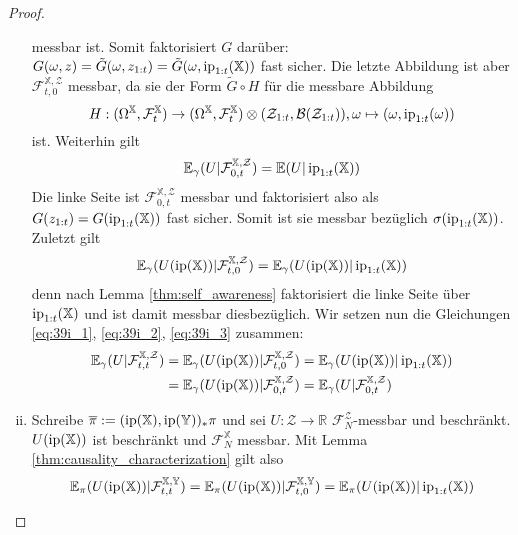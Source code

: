 \begin{proof}
\begin{enumerate}[(i)]
messbar ist. Somit faktorisiert $G$ darüber: $G(\omega, z) = \tilde{G}(\omega, z_{1:t}) = \tilde{G}(\omega, \operatorname{ip}_{1:t}(\mathbb{X}))$ fast sicher. Die letzte Abbildung ist aber $\mathcal{F}_{t,0}^{\mathbb{X}, \mathcal{Z}}$ messbar, da sie der Form $\widetilde{G}\circ H$ für die messbare Abbildung 
$$H: (\Omega^\mathbb{X}, \mathcal{F}_t^\mathbb{X}) \rightarrow (\Omega^\mathbb{X}, \mathcal{F}_t^\mathbb{X}) \otimes (\mathcal{Z}_{1:t}, \mathcal{B}(\mathcal{Z}_{1:t})), \omega \mapsto (\omega, \operatorname{ip}_{1:t}(\omega))$$
ist. Weiterhin gilt
\begin{equation}\label{eq:39i_2}
\mathbb{E}_\gamma(U \vert \mathcal{F}_{0, t}^{\mathbb{X}, \mathcal{Z}}) = \mathbb{E}(U \vert \operatorname{ip}_{1:t}(\mathbb{X}))
\end{equation}
Die linke Seite ist $\mathcal{F}_{0, t}^{\mathbb{X}, \mathcal{Z}}$ messbar und faktorisiert also als $G(z_{1:t})=G(\operatorname{ip}_{1:t}(\mathbb{X}))$ fast sicher. Somit ist sie messbar bezüglich $\sigma(\operatorname{ip}_{1:t}(\mathbb{X}))$.
Zuletzt gilt 
\begin{equation}\label{eq:39i_3}
\mathbb{E}_\gamma(U(\operatorname{ip}(\mathbb{X}))\vert \mathcal{F}_{t, 0}^{\mathbb{X}, \mathcal{Z}}) = \mathbb{E}_\gamma(U(\operatorname{ip}(\mathbb{X})) \vert \operatorname{ip}_{1:t}(\mathbb{X}))
\end{equation}
denn nach Lemma \ref{thm:self_awareness} faktorisiert die linke Seite über $\operatorname{ip}_{1:t}(\mathbb{X})$ und ist damit messbar diesbezüglich. Wir setzen nun die Gleichungen \ref{eq:39i_1}, \ref{eq:39i_2}, \ref{eq:39i_3} zusammen:
\begin{align*}
    \mathbb{E}_\gamma(U \vert \mathcal{F}_{t,t}^{\mathbb{X}, \mathcal{Z}}) &= \mathbb{E}_\gamma(U(\operatorname{ip}(\mathbb{X})) \vert \mathcal{F}_{t, 0}^{\mathbb{X}, \mathcal{Z}}) 
    = \mathbb{E}_\gamma(U(\operatorname{ip}(\mathbb{X}))\vert \operatorname{ip}_{1:t}(\mathbb{X})) \\
    &= \mathbb{E}_\gamma(U(\operatorname{ip}(\mathbb{X}))\vert \mathcal{F}_{0, t}^{\mathbb{X}, \mathcal{Z}}) = \mathbb{E}_\gamma(U \vert \mathcal{F}_{0, t}^{\mathbb{X}, \mathcal{Z}})
\end{align*}
\item Schreibe $\overline\pi:=(\operatorname{ip}(\mathbb{X}), \operatorname{ip}(\mathbb{Y}))_* \pi$ und sei $U:\mathcal{Z}\rightarrow \mathbb{R}$ $\mathcal{F}_{N}^{\mathcal{Z}}$-messbar und beschränkt. $U(\operatorname{ip}(\mathbb{X}))$ ist beschränkt und $\mathcal{F}_N^\mathbb{X}$ messbar. Mit Lemma \ref{thm:causality_characterization} gilt also
\begin{equation}\label{eq:310_0}
    \mathbb{E}_\pi(U(\ip(\mathbb{X}))\vert \mathcal{F}_{t,t}^{\mathbb{X}, \mathbb{Y}}) = \mathbb{E}_\pi(U(\ip(\mathbb{X}))\vert \mathcal{F}_{t, 0}^{\mathbb{X}, \mathbb{Y}}) = \mathbb{E}_\pi(U(\ip(\mathbb{X})) \vert \ip_{1:t}(\mathbb{X}))

\end{equation}
\end{enumerate}
\end{proof}
